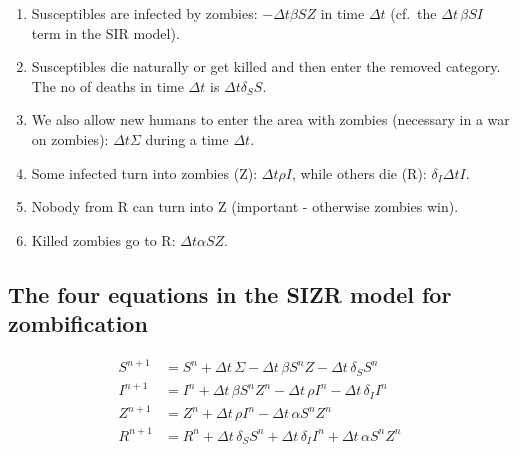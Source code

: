 \documentclass[%
twoside,                 %
final,                   %
10pt]{article}
\begin{document}
\begin{enumerate}
 \item Susceptibles are infected by zombies: $-\Delta t\beta SZ$ in time $\Delta t$ (cf.~the $\Delta t\,\beta SI$ term in the SIR model).

 \item Susceptibles die naturally or get killed and then enter the removed category. The no of deaths in time $\Delta t$ is $\Delta t\delta_S S$.

 \item We also allow new humans to enter the area with zombies (necessary in a war on zombies): $\Delta t\Sigma$ during a time $\Delta t$.

 \item Some infected turn into zombies (Z): $\Delta t\rho I$, while others die (R): $\delta_I\Delta t I$.

 \item Nobody from R can turn into Z (important - otherwise zombies win).

 \item Killed zombies go to R: $\Delta t\alpha SZ$.
\end{enumerate}

\noindent

\subsection{The four equations in the SIZR model for zombification}

\begin{align*}
S^{n+1} &= S^n + \Delta t\,\Sigma - \Delta t\,\beta S^nZ - \Delta t\,\delta_S S^n\\
I^{n+1} &= I^n + \Delta t\,\beta S^nZ^n - \Delta t\,\rho I^n - \Delta t\,\delta_I I^n\\
Z^{n+1} &= Z^n + \Delta t\,\rho I^n - \Delta t\,\alpha S^nZ^n\\
R^{n+1} &= R^n + \Delta t\,\delta_S S^n  + \Delta t\,\delta_I I^n +
\Delta t\,\alpha S^nZ^n
\end{align*}
\end{document}
